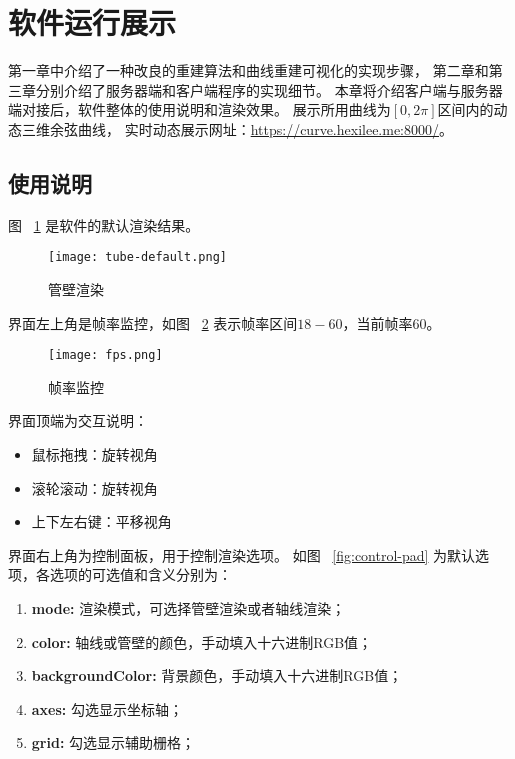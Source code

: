 \cleardoublepage

\section{软件运行展示}
第一章中介绍了一种改良的重建算法和曲线重建可视化的实现步骤，
第二章和第三章分别介绍了服务器端和客户端程序的实现细节。
本章将介绍客户端与服务器端对接后，软件整体的使用说明和渲染效果。
展示所用曲线为$[0, 2\pi]$区间内的动态三维余弦曲线，
实时动态展示网址：\href{https://curve.hexilee.me:8000/}{https://curve.hexilee.me:8000/}。

\subsection{使用说明}

图 ~\ref{fig:tube-default} 是软件的默认渲染结果。
\begin{figure}[H]
\centering
\texttt{[image: tube-default.png]}
\caption{管壁渲染}
\label{fig:tube-default}
\end{figure}

界面左上角是帧率监控，如图 ~\ref{fig:fps} 表示帧率区间$18-60$，当前帧率$60$。

\begin{figure}[H]
\centering
\texttt{[image: fps.png]}
\caption{帧率监控}
\label{fig:fps}
\end{figure}

界面顶端为交互说明：

\begin{itemize}
\item 鼠标拖拽：旋转视角
\item 滚轮滚动：旋转视角
\item 上下左右键：平移视角
\end{itemize}

界面右上角为控制面板，用于控制渲染选项。
如图 ~\ref{fig:control-pad} 为默认选项，各选项的可选值和含义分别为：

\begin{enumerate}
\item \textbf{mode: }渲染模式，可选择管壁渲染或者轴线渲染；
\item \textbf{color: }轴线或管壁的颜色，手动填入十六进制RGB值；
\item \textbf{backgroundColor: }背景颜色，手动填入十六进制RGB值；
\item \textbf{axes: }勾选显示坐标轴；
\item \textbf{grid: }勾选显示辅助栅格；
\end{enumerate}

